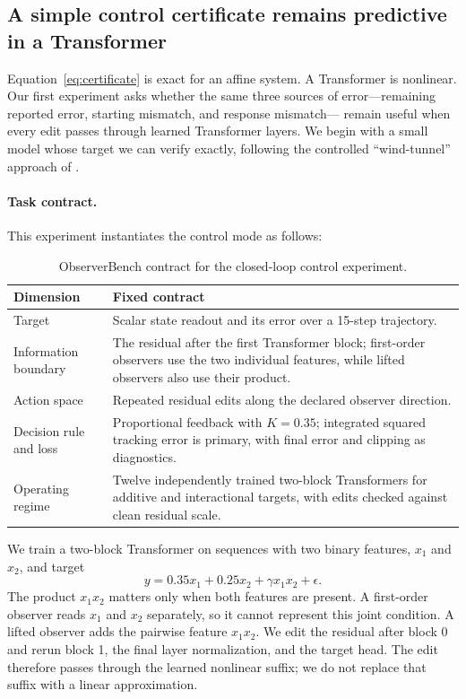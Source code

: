 \subsection{A simple control certificate remains predictive in a Transformer}
\label{sec:nonlinear-suffix}

Equation~\ref{eq:certificate} is exact for an affine system. A Transformer is
nonlinear. Our first experiment asks whether the same three sources of
error---remaining reported error, starting mismatch, and response mismatch---
remain useful when every edit passes through learned Transformer layers. We
begin with a small model whose target we can verify exactly, following the
controlled ``wind-tunnel'' approach of \cite{agarwal2025bayesian}.

\paragraph{Task contract.}
This experiment instantiates the control mode as follows:

\begin{table}[H]
\centering
\small
\begin{tabular}{@{}L{0.21\textwidth}L{0.71\textwidth}@{}}
\toprule
Dimension & Fixed contract \\
\midrule
Target & Scalar state readout and its error over a 15-step trajectory. \\
Information boundary & The residual after the first Transformer block;
first-order observers use the two individual features, while lifted observers
also use their product. \\
Action space & Repeated residual edits along the declared observer direction. \\
Decision rule and loss & Proportional feedback with $K=0.35$; integrated
squared tracking error is primary, with final error and clipping as diagnostics. \\
Operating regime & Twelve independently trained two-block Transformers for
additive and interactional targets, with edits checked against clean residual
scale. \\
\bottomrule
\end{tabular}
\caption{ObserverBench contract for the closed-loop control experiment.}
\label{tab:control-task-contract}
\end{table}

We train a two-block Transformer on sequences with two binary features, $x_1$
and $x_2$, and target
\[
y=0.35x_1+0.25x_2+\gamma x_1x_2+\epsilon.
\]
The product $x_1x_2$ matters only when both features are present. A first-order
observer reads $x_1$ and $x_2$ separately, so it cannot represent this joint
condition. A lifted observer adds the pairwise feature $x_1x_2$. We edit the
residual after block 0 and rerun block 1, the final layer normalization, and the
target head. The edit therefore passes through the learned nonlinear suffix;
we do not replace that suffix with a linear approximation.

